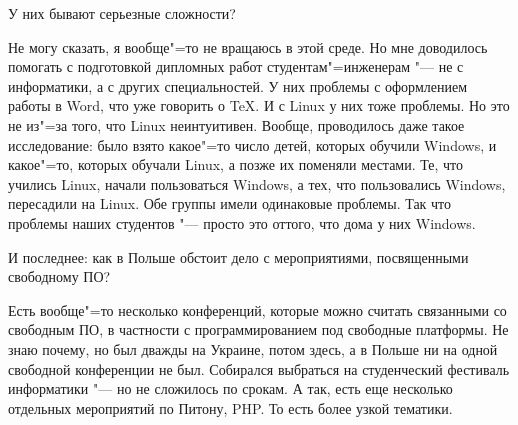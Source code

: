 \documentclass[10pt, a5paper]{article}
\begin{document}
\q У них бывают серьезные сложности?

\a Не могу сказать, я вообще"=то не вращаюсь в этой среде. Но мне доводилось помогать с подготовкой дипломных работ студентам"=инженерам "--- не с информатики, а с других специальностей. У них проблемы с оформлением работы в Word, что уже говорить о \TeX. И с Linux у них тоже проблемы. Но это не из"=за того, что Linux неинтуитивен. Вообще, проводилось даже такое исследование: было взято какое"=то число детей, которых обучили Windows, и какое"=то, которых обучали Linux, а позже их поменяли местами. Те, что учились Linux, начали пользоваться Windows, а тех, что пользовались Windows, пересадили на Linux. Обе группы имели одинаковые проблемы. Так что проблемы наших студентов "--- просто это оттого, что дома у них Windows. 

\q И последнее: как в Польше обстоит дело с мероприятиями, посвященными свободному ПО?

\a Есть вообще"=то несколько конференций, которые можно считать связанными со свободным ПО, в частности с программированием под свободные платформы. Не знаю почему, но был дважды на Украине, потом здесь, а в Польше ни на одной свободной конференции не был. Собирался выбраться на студенческий фестиваль информатики "--- но не сложилось по срокам. А так, есть еще несколько отдельных мероприятий по Питону, PHP. То есть более узкой тематики.
\end{document}
